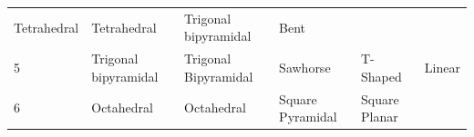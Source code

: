 \documentclass[]{article}
\begin{document}
\begin{longtable}[]{@{}llllll@{}}
\begin{minipage}[t]{0.16\columnwidth}
Tetrahedral\strut
\end{minipage} & \begin{minipage}[t]{0.14\columnwidth}\raggedright
Tetrahedral\strut
\end{minipage} & \begin{minipage}[t]{0.15\columnwidth}\raggedright
Trigonal bipyramidal\strut
\end{minipage} & \begin{minipage}[t]{0.10\columnwidth}\raggedright
Bent\strut
\end{minipage} & \begin{minipage}[t]{0.09\columnwidth}\raggedright
\strut
\end{minipage}\tabularnewline
\begin{minipage}[t]{0.20\columnwidth}\raggedright
5\strut
\end{minipage} & \begin{minipage}[t]{0.16\columnwidth}\raggedright
Trigonal bipyramidal\strut
\end{minipage} & \begin{minipage}[t]{0.14\columnwidth}\raggedright
Trigonal Bipyramidal\strut
\end{minipage} & \begin{minipage}[t]{0.15\columnwidth}\raggedright
Sawhorse\strut
\end{minipage} & \begin{minipage}[t]{0.10\columnwidth}\raggedright
T-Shaped\strut
\end{minipage} & \begin{minipage}[t]{0.09\columnwidth}\raggedright
Linear\strut
\end{minipage}\tabularnewline
\begin{minipage}[t]{0.20\columnwidth}\raggedright
6\strut
\end{minipage} & \begin{minipage}[t]{0.16\columnwidth}\raggedright
Octahedral\strut
\end{minipage} & \begin{minipage}[t]{0.14\columnwidth}\raggedright
Octahedral\strut
\end{minipage} & \begin{minipage}[t]{0.15\columnwidth}\raggedright
Square Pyramidal\strut
\end{minipage} & \begin{minipage}[t]{0.10\columnwidth}\raggedright
Square Planar\strut
\end{minipage} & \begin{minipage}[t]{0.09\columnwidth}\raggedright

\end{minipage}
\end{longtable}
\end{document}
